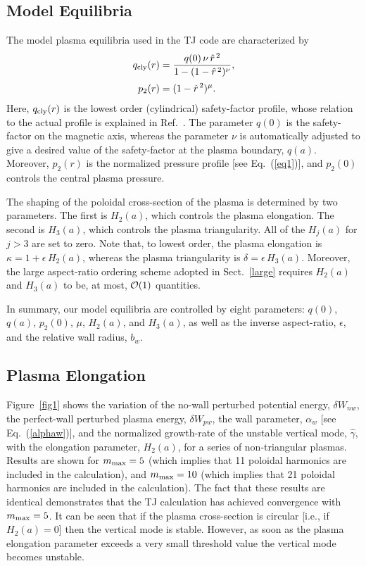 \documentclass[12pt,prb,aps]{revtex4-1}
\begin{document}
\subsection{Model Equilibria}
The model plasma equilibria used in the TJ code are characterized by
\begin{align}
q_{\rm cly}(r) &= \frac{q(0)\,\nu\,\hat{r}^{\,2}}{1-(1-\hat{r}^{\,2})^\nu},\\[0.5ex]
p_2(r)&=(1-\hat{r}^{\,2})^\mu.
\end{align}
Here, $q_{\rm cly}(r)$ is the lowest order (cylindrical) safety-factor profile, whose relation to the actual profile is explained in Ref.~. The parameter $q(0)$ is the
safety-factor on the magnetic axis, whereas the parameter $\nu$ is automatically adjusted to give a desired value of the safety-factor at the plasma boundary, $q(a)$.  
Moreover, $p_2(r)$ is the normalized pressure profile [see Eq.~(\ref{eq1})], and $p_2(0)$ controls the central plasma pressure.
 
 The shaping of the
poloidal cross-section of the plasma is determined by two parameters. The first is  $H_2(a)$, which controls the plasma elongation. The second is $H_3(a)$, which
controls the plasma triangularity. All of the  $H_j(a)$ for $j>3$ are set to zero.
Note that, to lowest order, the plasma elongation is $\kappa=1+\epsilon\,H_2(a)$, whereas the plasma triangularity is $\delta =\epsilon\,H_3(a)$.\cite{eql} Moreover, the large aspect-ratio ordering scheme
adopted in Sect.~\ref{large} requires $H_2(a)$ and $H_3(a)$ to be, at most, ${\cal O}(1)$ quantities. 

In summary, our model equilibria are controlled by eight parameters: $q(0)$, $q(a)$, $p_2(0)$, $\mu$, $H_2(a)$, and $H_3(a)$, as well as the inverse aspect-ratio, $\epsilon$,
and the relative wall radius, $b_w$.  

\subsection{Plasma Elongation}
Figure~\ref{fig1} shows the variation of the no-wall perturbed potential energy, $\delta W_{nw}$, the perfect-wall perturbed plasma energy, $\delta W_{pw}$, the wall 
parameter, $\alpha_w$ [see Eq.~(\ref{alphaw})], and the normalized growth-rate of the unstable vertical mode, $\hat{\gamma}$,  with the elongation parameter, $H_2(a)$, for a series of non-triangular plasmas. Results are shown for $m_{\rm max} = 5$ (which implies that 11 poloidal harmonics are included in the calculation), and $m_{\rm max}=10$ 
(which implies that 21  poloidal harmonics are included in the calculation). The fact that these results are identical demonstrates that the TJ calculation has achieved convergence with
$m_{\rm max}=5$. 
It can be seen that if the
plasma cross-section is circular [i.e., if $H_2(a)=0$] then the vertical mode is stable. However, as soon as the plasma elongation parameter exceeds a very small threshold
value the vertical mode becomes unstable.
\end{document}
